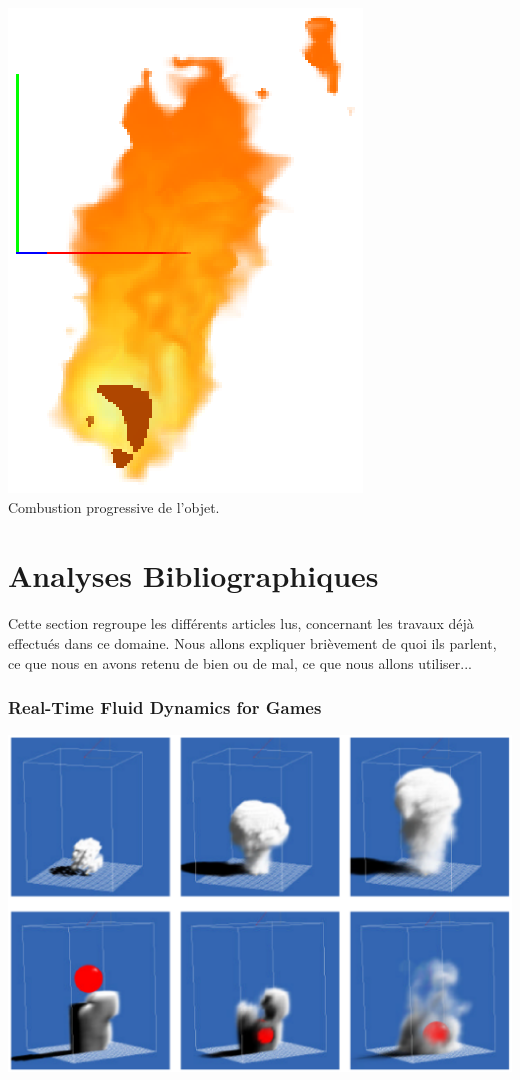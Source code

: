 \documentclass[a4paper,10pt]{article}
\begin{document}
\begin{center}
	\includegraphics[scale=0.6]{Decomposition5.ps}\\
	Combustion progressive de l'objet.
\end{center}  

\newpage
\section{Analyses Bibliographiques}
Cette section regroupe les différents articles lus, concernant les travaux déjà effectués dans ce domaine. 
Nous allons expliquer brièvement de quoi ils parlent, ce que nous en avons retenu de bien ou de mal, ce que nous allons 
utiliser...

\subsubsection{Real-Time Fluid Dynamics for Games}
    \begin{center}
	\includegraphics[scale=0.5]{JosStam1.ps}
    \end{center}
\end{document}
